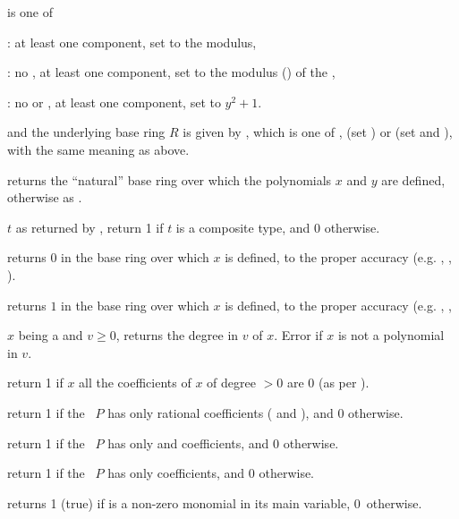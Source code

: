 
 is one of

: at least one  component,
set  to the modulus,

: no , at least one  component,
set  to the modulus () of the ,

: no  or , at least one 
component, set  to $y^2 + 1$.

and the underlying base ring $R$ is given by , which
is one of ,  (set ) or 
(set  and ), with the same meaning
as above.

 returns
the ``natural'' base ring over which the polynomials $x$ and $y$ are defined,
otherwise as .

 $t$ as returned by ,
return 1 if $t$ is a composite type, and 0 otherwise.

 returns $0$ in the base ring over which $x$
is defined, to the proper accuracy (e.g. , ,
).

 returns $1$ in the base ring over which $x$
is defined, to the proper accuracy (e.g. , ,


 $x$ being a  and $v \geq 0$,
returns the degree in $v$ of $x$. Error if $x$ is not a polynomial in $v$.

 return 1 if $x$ all the coefficients of
$x$ of degree $> 0$ are $0$ (as per ).

 return 1 if the ~$P$ has only
rational coefficients ( and ), and 0 otherwise.

 return 1 if the ~$P$ has only
 and  coefficients, and 0 otherwise.

 return 1 if the ~$P$ has only
 coefficients, and 0 otherwise.

 returns 1 (true) if  is a non-zero
monomial in its main variable, 0~otherwise.

